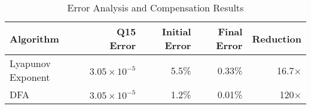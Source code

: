 \begin{table}[htbp]
\centering
\caption{Error Analysis and Compensation Results}
\label{tab:error}
\begin{tabular}{lrrrr}
\hline
Algorithm & Q15 Error & Initial Error & Final Error & Reduction \\
\hline
Lyapunov Exponent & $3.05 \times 10^{-5}$ & 5.5\% & 0.33\% & 16.7$\times$ \\
DFA & $3.05 \times 10^{-5}$ & 1.2\% & 0.01\% & 120$\times$ \\
\hline
\end{tabular}
\end{table}